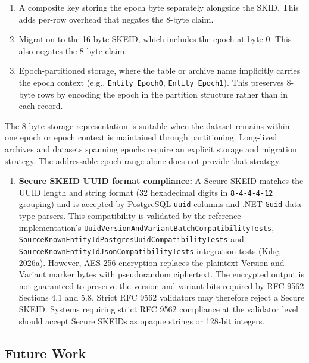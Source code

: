 \documentclass[fleqn,10pt,lineno]{wlpeerj}
\providecommand{\tightlist}{%
  \setlength{\itemsep}{0pt}\setlength{\parskip}{0pt}}
\begin{document}
\begin{enumerate}
  \begin{enumerate}
  \def\labelenumii{\arabic{enumii}.}
  \item
    A composite key storing the epoch byte separately alongside the
    SKID. This adds per-row overhead that negates the 8-byte claim.
  \item
    Migration to the 16-byte SKEID, which includes the epoch at byte 0.
    This also negates the 8-byte claim.
  \item
    Epoch-partitioned storage, where the table or archive name
    implicitly carries the epoch context (e.g., \texttt{Entity\_Epoch0},
    \texttt{Entity\_Epoch1}). This preserves 8-byte rows by encoding the
    epoch in the partition structure rather than in each record.
  \end{enumerate}
\end{enumerate}

The 8-byte storage representation is suitable when the dataset remains
within one epoch or epoch context is maintained through partitioning.
Long-lived archives and datasets spanning epochs require an explicit
storage and migration strategy. The addressable epoch range alone does
not provide that strategy.

\begin{enumerate}
\def\labelenumi{\arabic{enumi}.}
\setcounter{enumi}{5}
\tightlist
\item
  \textbf{Secure SKEID UUID format compliance:} A Secure SKEID matches
  the UUID length and string format (32 hexadecimal digits in
  \texttt{8-4-4-4-12} grouping) and is accepted by PostgreSQL
  \texttt{uuid} columns and .NET \texttt{Guid} data-type parsers. This
  compatibility is validated by the reference implementation's
  \texttt{UuidVersionAndVariantBatchCompatibilityTests},
  \texttt{SourceKnownEntityIdPostgresUuidCompatibilityTests} and
  \texttt{SourceKnownEntityIdJsonCompatibilityTests} integration tests
  (Kılıç, 2026a). However, AES-256 encryption replaces the plaintext
  Version and Variant marker bytes with pseudorandom ciphertext. The
  encrypted output is not guaranteed to preserve the version and variant
  bits required by RFC 9562 Sections 4.1 and 5.8. Strict RFC 9562
  validators may therefore reject a Secure SKEID. Systems requiring
  strict RFC 9562 compliance at the validator level should accept Secure
  SKEIDs as opaque strings or 128-bit integers.
\end{enumerate}

\subsection{Future Work}\label{future-work}
\end{document}

